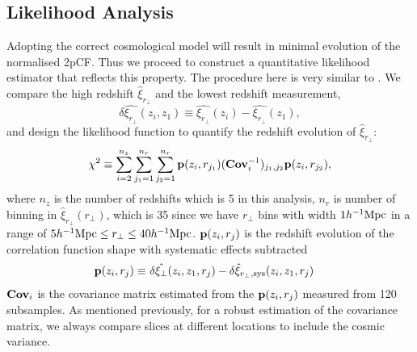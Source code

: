 \documentclass[iop]{emulateapj}
\begin{document}








\subsection{Likelihood Analysis}


Adopting the correct cosmological model will result in minimal evolution of the normalised 2pCF.
Thus we proceed to construct a quantitative likelihood estimator that reflects this property.
The procedure here is very similar to \cite{Li2014,Li2015,Li2016}.
We compare the high redshift $\hat\xi_{r_\perp}$ and the lowest redshift measurement,
\begin{equation}
 \delta \hat{\xi_{r_\perp}}(z_i,z_1) \equiv \hat{\xi_{r_\perp}}(z_i) - \hat{\xi_{r_\perp}}(z_1),
\end{equation}
and design the likelihood function to quantify
the redshift evolution of $\hat\xi_{r_\perp}$:
\begin{equation}\label{eq:chisq1}
\chi^2\equiv \sum_{i=2}^{n_{z}} \sum_{j_1=1}^{n_{r}} \sum_{j_2=1}^{n_{r}} {\bf p}(z_i,r_{j_1}) ({\bf Cov}_{i}^{-1})_{j_1,j_2}  {\bf p}(z_i,r_{j_2}),
\end{equation}
where $n_z$ is the number of redshifts which is 5 in this analysis, 
$n_r$ is number of binning in $\hat{\xi}_{r_\perp}(r_\perp)$,
which is 35 since we have $r_\perp$ bins 
with width $1h^{-1}\rm Mpc$ in a range of $5h^{-1}{\rm Mpc}\leq r_\perp\leq 40h^{-1}{\rm Mpc}$.
${\bf p}(z_i,r_{j})$ is the redshift evolution of the correlation function shape with systematic effects subtracted
\begin{eqnarray}\label{eq:bfp}
 {\bf p}(z_i,r_{j}) \equiv&\ \delta \hat{\xi_\perp}(z_i,z_1,r_j) - \delta \hat{\xi}_{r_\perp,\rm sys}(z_i,z_1,r_j)
\end{eqnarray}
${\bf Cov}_i$ is the covariance matrix estimated from the ${\bf p}(z_i,r_{j})$ measured from 120 subsamples.
As mentioned previously, for a robust estimation of the covariance matrix, 
we always compare slices at different locations to 
include the cosmic variance.
\end{document}
